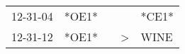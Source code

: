 \begin{supertabular}{p{0.07\textwidth}p{0.06\textwidth}p{0.02\textwidth}p{0.02\textwidth}p{0.06\textwidth}}
 12-31-04\textsuperscript{} &  *OE1* &   &               &                   *CE1* \\
 12-31-12\textsuperscript{} &  *OE1* &   &  \textgreater &  WINE\textsuperscript{} \\
\end{supertabular}

